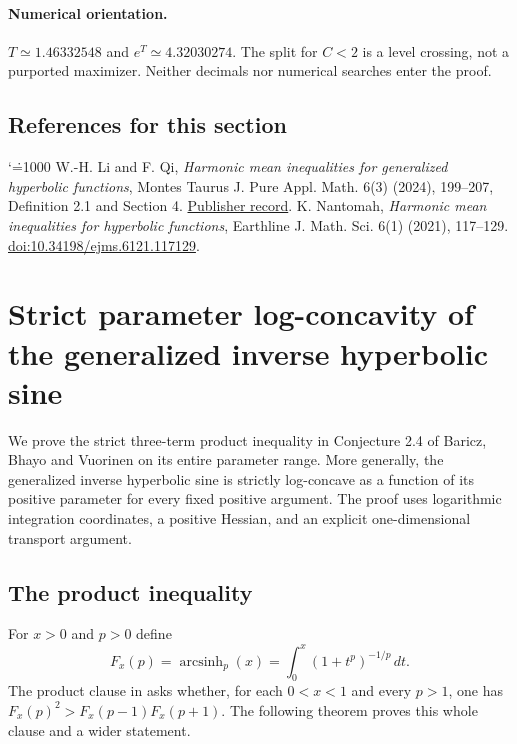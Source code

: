 \documentclass[11pt,a4paper]{article}
\makeatletter
\numberwithin{equation}{section}
\theoremstyle{definition}
\theoremstyle{remark}
\newenvironment{sectionabstract}{\par\smallskip\begingroup\small\noindent}{\par\endgroup\medskip}
\renewenvironment{thebibliography}[1]
 {\subsection*{References for this section}\small
  \list{\@biblabel{\@arabic\c@enumiv}}
       {\settowidth\labelwidth{\@biblabel{#1}}\leftmargin\labelwidth
        \advance\leftmargin\labelsep\@openbib@code
        \usecounter{enumiv}\let\p@enumiv\@empty
        \renewcommand\theenumiv{\@arabic\c@enumiv}}
  \sloppy\clubpenalty4000\widowpenalty4000\sfcode`\.=1000\relax}
 {\def\@noitemerr{\@latex@warning{Empty bibliography}}\endlist}
\makeatother
\begin{document}
\paragraph{Numerical orientation.} $T\simeq1.46332548$ and $e^T\simeq4.32030274$. The split for $C<2$ is a level crossing, not a purported maximizer. Neither decimals nor numerical searches enter the proof.
\begin{thebibliography}{9}
 W.-H. Li and F. Qi, \emph{Harmonic mean inequalities for generalized hyperbolic functions}, Montes Taurus J. Pure Appl. Math. 6(3) (2024), 199--207, Definition 2.1 and Section 4.
\href{https://mtjpamjournal.com/papers/article_id_mtjpam-d-23-00053/}{Publisher record}.
 K. Nantomah, \emph{Harmonic mean inequalities for hyperbolic functions}, Earthline J. Math. Sci. 6(1) (2021), 117--129. \href{https://doi.org/10.34198/ejms.6121.117129}{doi:10.34198/ejms.6121.117129}.
\end{thebibliography}

\par\endgroup

\begingroup
\newcommand{\R}{\mathbb R}
\section{\texorpdfstring{Strict parameter log-concavity of the generalized inverse hyperbolic sine}{Strict parameter log-concavity of the generalized inverse hyperbolic sine}}\label{section:r29taisho}
\par\medskip

\begin{sectionabstract}
We prove the strict three-term product inequality in Conjecture 2.4 of Baricz, Bhayo and Vuorinen on its entire parameter range. More generally, the generalized inverse hyperbolic sine is strictly log-concave as a function of its positive parameter for every fixed positive argument. The proof uses logarithmic integration coordinates, a positive Hessian, and an explicit one-dimensional transport argument.
\end{sectionabstract}
\subsection{The product inequality}
For $x>0$ and $p>0$ define
\[
 F_x(p)=\operatorname{arcsinh}_p(x)=\int_0^x(1+t^p)^{-1/p}\,dt.
\]
The product clause in \cite[Conjecture~2.4]{r29taisho:bbv} asks whether, for each
$0<x<1$ and every $p>1$, one has $F_x(p)^2>F_x(p-1)F_x(p+1)$.
The following theorem proves this whole clause and a wider statement.
\end{document}
